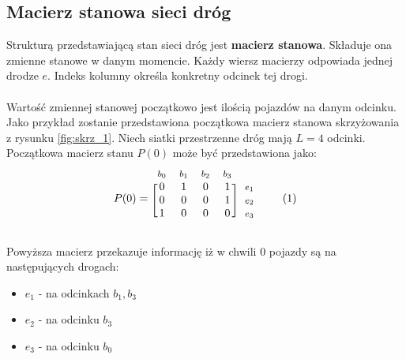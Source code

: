 \documentclass[12pt]{book}
\newcommand\addtag{\refstepcounter{equation}
\tag{\theequation}}
\begin{document}
\subsection{Macierz stanowa sieci dróg}
Strukturą przedstawiającą stan sieci dróg jest \textbf{macierz stanowa}. Składuje ona zmienne stanowe w danym momencie. Każdy wiersz macierzy odpowiada jednej drodze $e$. Indeks kolumny określa konkretny odcinek tej drogi. \\ \\ Wartość zmiennej stanowej początkowo jest ilością pojazdów na danym odcinku.
Jako przykład zostanie przedstawiona początkowa macierz stanowa skrzyżowania z rysunku \ref{fig:skrz_1}. Niech siatki przestrzenne dróg mają $L=4$ odcinki. Początkowa macierz stanu $P(0)$ może być przedstawiona jako:
\begin{equation*}
  P(0)=
  \begin{blockarray}{*{4}{c} l}
    \begin{block}{*{4}{>{$\footnotesize}c<{$}} l}
      $b_0$ & $b_1$ & $b_2$ & $b_3$ \\
    \end{block}
    \begin{block}{[*{4}{c}]>{$\footnotesize}l<{$}}
       0 & 1 & 0 & 1 & $e_1$ \\
       0 & 0 & 0 & 1 & $e_2$ \\
       1 & 0 & 0 & 0 & $e_3$ \\
    \end{block}
  \end{blockarray} \addtag \label{skrz_1_x0}
\end{equation*}


Powyższa macierz przekazuje informację iż w chwili $0$ pojazdy są na następujących drogach:
\begin{itemize}
\item $e_1$ - na odcinkach $b_1,b_3$ 
\item $e_2$ - na odcinku $b_3$ 
\item $e_3$ - na odcinku $b_0$ 
\end{itemize}
\end{document}
